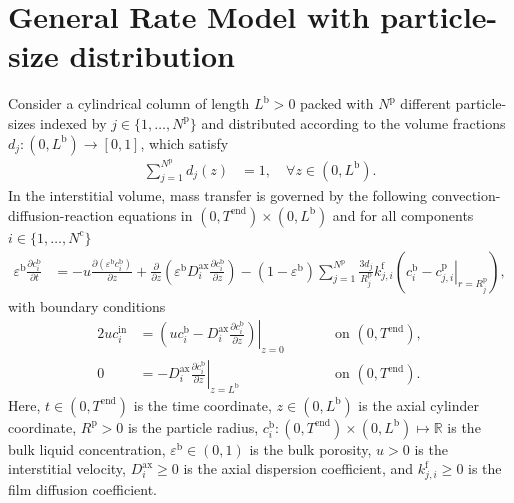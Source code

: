 \documentclass{article}
\begin{document}
\section*{General Rate Model with particle-size distribution}
Consider a cylindrical column of length $L^{\mathrm{b}} > 0$ packed with $N^{\mathrm{p}}$ different particle-sizes indexed by $j \in \{1, \dots, N^{\mathrm{p}}\}$ and distributed according to the volume fractions $d_{j} \colon (0, L^{\mathrm{b}}) \to [0, 1]$, which satisfy
\begin{align}
    \sum_{j=1}^{N^{\mathrm{p}}} d_{j}(z)
    &= 1, \quad \forall z \in (0, L^{\mathrm{b}}).
\end{align}
In the interstitial volume, mass transfer is governed by the following convection-diffusion-reaction equations in $(0, T^{\mathrm{end}})\times (0, L^{\mathrm{b}})$ and for all components $i\in\{1, \dots, N^{\mathrm{c}} \}$
\begin{align}
    \varepsilon^{\mathrm{b}} \frac{\partial c^{\mathrm{b}}_{i}}{\partial t}
    &= - u \frac{\partial \left( \varepsilon^{\mathrm{b}} c^{\mathrm{b}}_{i} \right)}{\partial z}
        + \frac{\partial}{\partial z} \left( \varepsilon^{\mathrm{b}} D^{\mathrm{ax}}_{i} \frac{\partial c^{\mathrm{b}}_{i}}{\partial z} \right)
        - \left(1 - \varepsilon^{\mathrm{b}} \right) \sum_{j=1}^{N^{\mathrm{p}}} \frac{3d_{j}}{R^{\mathrm{p}}_{j}} k^{\mathrm{f}}_{j,i} \left(c^{\mathrm{b}}_{i} - \left. c^{\mathrm{p}}_{j,i} \right|_{r = R^{\mathrm{p}}_{j}} \right),
\end{align}
with boundary conditions
\begin{alignat}{2}
    u c^{\mathrm{in}}_{i}
    &= \left.\left( u c^{\mathrm{b}}_{i} - D^{\mathrm{ax}}_{i} \frac{\partial c^{\mathrm{b}}_{i}}{\partial z}\right)\right|_{z=0}
    & & \qquad\text{on }(0, T^{\mathrm{end}}),
    \\
    0
    &= - D^{\mathrm{ax}}_{i} \left. \frac{\partial c^{\mathrm{b}}_{i}}{\partial z} \right|_{z=L^{\mathrm{b}}}
    & & \qquad\text{on }(0, T^{\mathrm{end}}).
\end{alignat}
Here, $t\in (0, T^{\mathrm{end}})$ is the time coordinate, $z\in (0, L^{\mathrm{b}})$ is the axial cylinder coordinate, $R^{\mathrm{p}}> 0$ is the particle radius, $c^{\mathrm{b}}_{i}\colon (0, T^{\mathrm{end}})\times (0, L^{\mathrm{b}}) \mapsto \mathbb{R}$ is the bulk liquid concentration, $\varepsilon^{\mathrm{b}}\in (0, 1)$ is the bulk porosity, $u> 0$ is the interstitial velocity, $D^{\mathrm{ax}}_{i}\geq 0$ is the axial dispersion coefficient, and $k^{\mathrm{f}}_{j,i}\geq 0$ is the film diffusion coefficient.
\end{document}
